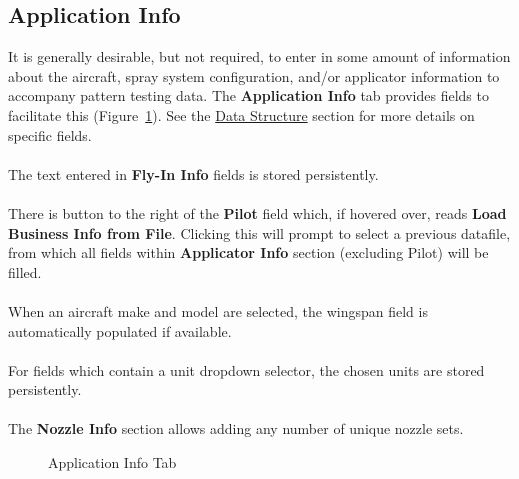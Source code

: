 \documentclass[10pt,letterpaper,titlepage]{article}
\begin{document}
    \subsection{Application Info}
    It is generally desirable, but not required, to enter in some amount of information about the aircraft, spray system configuration, and/or applicator information to accompany pattern testing data. The \textbf{Application Info} tab provides fields to facilitate this (Figure~\ref{fig:application_info}). See the \hyperref[sec:data]{Data Structure} section for more details on specific fields.
    \\\\
    The text entered in \textbf{Fly-In Info} fields is stored persistently.
    \\\\
    There is button to the right of the \textbf{Pilot} field which, if hovered over, reads \textbf{Load Business Info from File}. Clicking this will prompt to select a previous datafile, from which all fields within \textbf{Applicator Info} section (excluding Pilot) will be filled.
    \\\\
    When an aircraft make and model are selected, the wingspan field is automatically populated if available.
    \\\\
    For fields which contain a unit dropdown selector, the chosen units are stored persistently.
    \\\\
    The \textbf{Nozzle Info} section allows adding any number of unique nozzle sets. 

    \begin{figure}[hb]
        \centering
        \caption{Application Info Tab}
        \label{fig:application_info}
    \end{figure}
    \FloatBarrier
\end{document}
